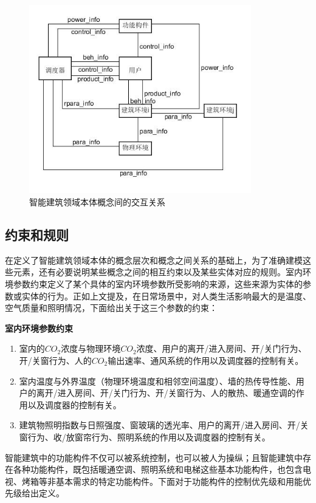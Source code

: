 	\begin{figure}[!t]
	\centering
	\includegraphics[width=3.8in]{context.jpg}
	\caption{智能建筑领域本体概念间的交互关系}
	\label{context}
	\end{figure}
	
\subsection{约束和规则}
	在定义了智能建筑领域本体的概念层次和概念之间关系的基础上，为了准确建模这些元素，还有必要说明某些概念之间的相互约束以及某些实体对应的规则。室内环境参数约束定义了某个具体的室内环境参数所受影响的来源，这些来源为实体的参数或实体的行为。正如上文提及，在日常场景中，对人类生活影响最大的是温度、空气质量和照明情况，下面给出关于这三个参数的约束：
	
	\textbf{室内环境参数约束}
	\begin{enumerate}
	\item 室内的$CO_{2}$浓度与物理环境$CO_{2}$浓度、用户的离开/进入房间、开/关门行为、开/关窗行为、人的$CO_{2}$输出速率、通风系统的作用以及调度器的控制有关。
	\item 室内温度与外界温度（物理环境温度和相邻空间温度）、墙的热传导性能、用户的离开/进入房间、开/关门行为、开/关窗行为、人的散热、暖通空调的作用以及调度器的控制有关。
	\item 建筑物照明指数与日照强度、窗玻璃的透光率、用户的离开/进入房间、开/关窗行为、收/放窗帘行为、照明系统的作用以及调度器的控制有关。
	\end{enumerate}

	智能建筑中的功能构件不仅可以被系统控制，也可以被人为操纵；且智能建筑中存在各种功能构件，既包括暖通空调、照明系统和电梯这些基本功能构件，也包含电视、烤箱等非基本需求的特定功能构件。下面对于功能构件的控制优先级和用能优先级给出定义。
	
